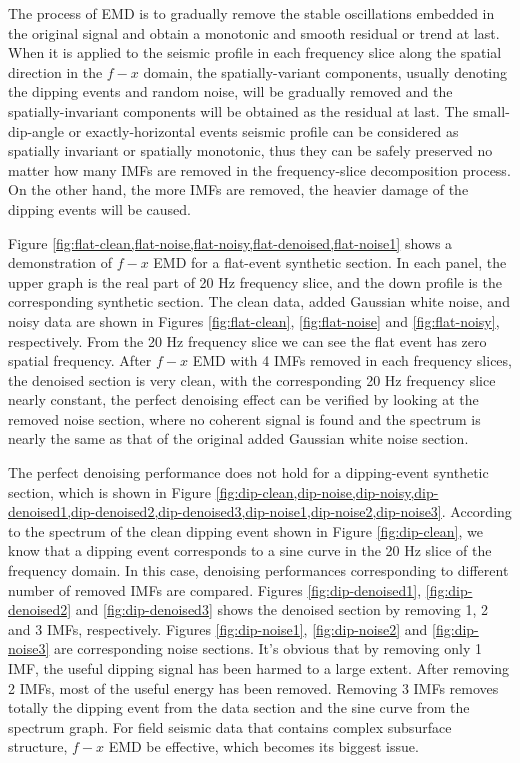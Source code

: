The process of EMD is to gradually remove the stable oscillations embedded in the original signal and obtain a monotonic and smooth residual or trend at last. When it is applied to the seismic profile in each frequency slice along the spatial direction in the $f-x$ domain, the spatially-variant components, usually denoting the dipping events and random noise, will be gradually removed and the spatially-invariant components will be obtained as the residual at last. The small-dip-angle or exactly-horizontal events seismic profile can be considered as spatially invariant or spatially monotonic, thus they can be safely preserved no matter how many IMFs are removed in the frequency-slice decomposition process. On the other hand, the more IMFs are removed, the heavier damage of the dipping events will be caused.

Figure \ref{fig:flat-clean,flat-noise,flat-noisy,flat-denoised,flat-noise1} shows a demonstration of $f-x$ EMD for a flat-event synthetic section. In each panel, the upper graph is the real part of 20 Hz frequency slice, and the down profile is the corresponding synthetic section. The clean data, added Gaussian white noise, and noisy data are shown in Figures \ref{fig:flat-clean}, \ref{fig:flat-noise} and \ref{fig:flat-noisy}, respectively. From the 20 Hz frequency slice we can see the flat event has zero spatial frequency. After $f-x$ EMD with 4 IMFs removed in each frequency slices, the denoised section is very clean, with the corresponding 20 Hz frequency slice nearly constant, the perfect denoising effect can be verified by looking at the removed noise section, where no coherent signal is found and the spectrum is nearly the same as that of the original added Gaussian white noise section. 

The perfect denoising performance does not hold for a dipping-event synthetic section, which is shown in Figure \ref{fig:dip-clean,dip-noise,dip-noisy,dip-denoised1,dip-denoised2,dip-denoised3,dip-noise1,dip-noise2,dip-noise3}. According to the spectrum of the clean dipping event shown in Figure \ref{fig:dip-clean}, we know that a dipping event corresponds to a sine curve in the 20 Hz slice of the frequency domain. In this case, denoising performances corresponding to different number of removed IMFs are compared. Figures \ref{fig:dip-denoised1}, \ref{fig:dip-denoised2} and \ref{fig:dip-denoised3} shows the denoised section by removing 1, 2 and 3 IMFs, respectively. Figures \ref{fig:dip-noise1}, \ref{fig:dip-noise2} and \ref{fig:dip-noise3} are corresponding noise sections. It's obvious that by removing only 1 IMF, the useful dipping signal has been harmed to a large extent. After removing 2 IMFs, most of the useful energy has been removed. Removing 3 IMFs removes totally the dipping event from the data section and the sine curve from the spectrum graph. For field seismic data that contains complex subsurface structure, $f-x$ EMD  be effective, which becomes its biggest issue.

